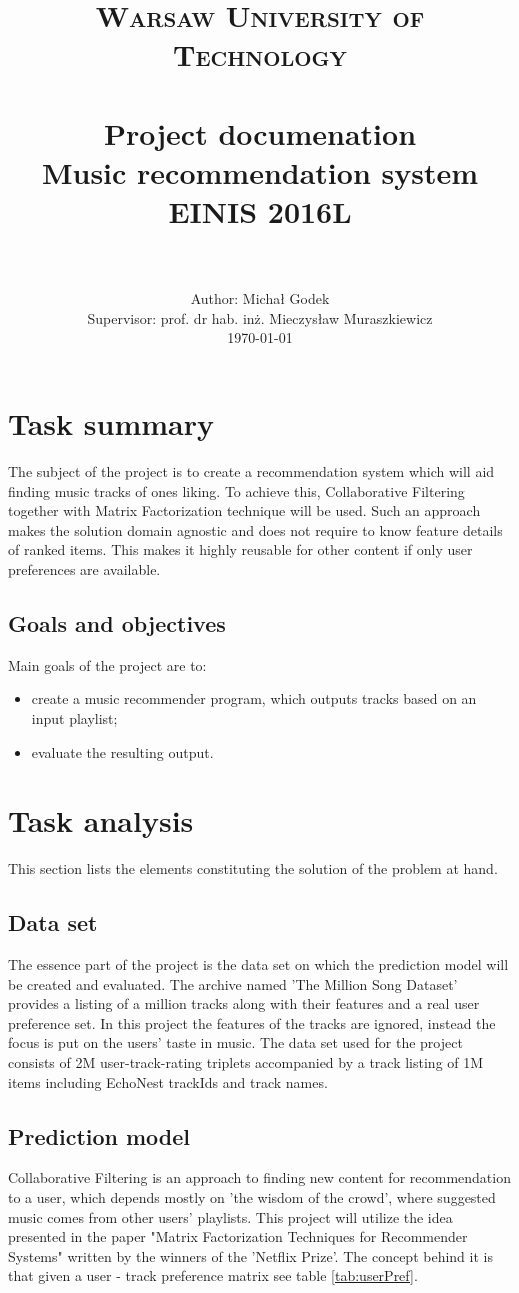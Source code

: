 \documentclass{article}
\title{
		\usefont{OT1}{bch}{b}{n}
		\normalfont \normalsize \textsc{Warsaw University of Technology} \\ [25pt]
		\horrule{1pt} \\[0.4cm]
		\normalfont \normalsize Project documenation\\
		\huge Music recommendation system \\[0.3cm]
		\normalfont \normalsize EINIS 2016L\\
		\horrule{1pt} \\[0.5cm]
}
\author{
		\normalfont 	\normalsize
        Author: Michał Godek	\normalsize \\[0.2cm]
        \footnotesize Supervisor: prof. dr hab. inż. Mieczysław Muraszkiewicz \normalfont 	 \normalsize \\[0.5cm]
        \today \\[-3pt]
}
\date{}
\numberwithin{equation}{section}		%
\numberwithin{figure}{section}			%
\numberwithin{table}{section}				%
\begin{document}
\maketitle
\newpage
\tableofcontents
\newpage

\section{Task summary}
The subject of the project is to create a recommendation system which will aid finding music tracks of ones liking. To achieve this, Collaborative Filtering together with Matrix Factorization technique will be used. Such an approach makes the solution domain agnostic and does not require to know feature details of ranked items. This makes it highly reusable for other content if only user preferences are available.

\subsection{Goals and objectives}
Main goals of the project are to:
\begin{itemize}
	\item create a music recommender program, which outputs tracks based on an input playlist;
	\item evaluate the resulting output.
\end{itemize}

\section{Task analysis}
This section lists the elements constituting the solution of the problem at hand.

\subsection{Data set}
The essence part of the project is the data set on which the prediction model will be created and evaluated. The archive named 'The Million Song Dataset'\cite{Bertin-Mahieux2011} provides a listing of a million tracks along with their features and a real user preference set. In this project the features of the tracks are ignored, instead the focus is put on the users' taste in music.
The data set used for the project consists of 2M user-track-rating triplets accompanied by a track listing of 1M items including EchoNest trackIds and track names.

\subsection{Prediction model}
Collaborative Filtering is an approach to finding new content for recommendation to a user, which depends mostly on 'the wisdom of the crowd', where suggested music comes from other users' playlists. 
This project will utilize the idea presented in the paper "Matrix Factorization
Techniques for Recommender Systems"\cite{Koren:2009:MFT:1608565.1608614} written by the winners of the 'Netflix Prize'. The concept behind it is that given a user - track preference matrix see table \vref{tab:userPref}.
\end{document}
